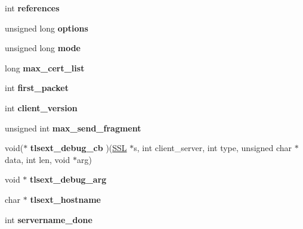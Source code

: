 \begin{DoxyCompactItemize}
\item 
\mbox{\label{structssl__st_ac62377797495ce179f0110cb70867ccc}} 
int {\bfseries references}
\item 
\mbox{\label{structssl__st_a82c8bfd123603c23ccca6fb45be6d75f}} 
unsigned long {\bfseries options}
\item 
\mbox{\label{structssl__st_a10add2996a9ac029c3a8a4c19587e1b0}} 
unsigned long {\bfseries mode}
\item 
\mbox{\label{structssl__st_add94a8a6fe24dad252c559253d0eea9a}} 
long {\bfseries max\+\_\+cert\+\_\+list}
\item 
\mbox{\label{structssl__st_ad3c31c44e1c20703dc023f4a14fa0d54}} 
int {\bfseries first\+\_\+packet}
\item 
\mbox{\label{structssl__st_af898db9604614a95a6830fbb5ce31850}} 
int {\bfseries client\+\_\+version}
\item 
\mbox{\label{structssl__st_a201ff2c24c4a950fc529451563dac099}} 
unsigned int {\bfseries max\+\_\+send\+\_\+fragment}
\item 
\mbox{\label{structssl__st_af36d613ef84698654b438baf81872ee6}} 
void($\ast$ {\bfseries tlsext\+\_\+debug\+\_\+cb} )(\hyperlink{structssl__st}{S\+SL} $\ast$s, int client\+\_\+server, int type, unsigned char $\ast$data, int len, void $\ast$arg)
\item 
\mbox{\label{structssl__st_a37c9fa10121176491c8a9e5617f7be83}} 
void $\ast$ {\bfseries tlsext\+\_\+debug\+\_\+arg}
\item 
\mbox{\label{structssl__st_a693888a588035f237e93b0bce7af4b84}} 
char $\ast$ {\bfseries tlsext\+\_\+hostname}
\item 
\mbox{\label{structssl__st_ac1ac6725cca99bc51b875fbe62ccb504}} 
int {\bfseries servername\+\_\+done}
\item 
\mbox{\label{structssl__st_aba46c200c19caf4051d001f5ca0475e3}} 

\end{DoxyCompactItemize}
